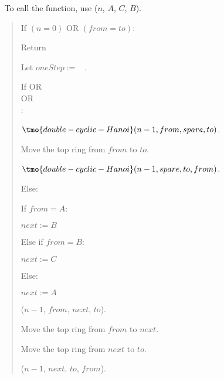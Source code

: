 \documentclass[10pt]{article}
\begin{document}
\begin{solution}\ %
  To call the function, use ($n$, $A$, $C$, $B$).
  \begin{quote}
  \noindent{}%

  \begin{steps}
    \item If $(n = 0)$ OR $(from = to)$:
      \begin{steps}
        \item Return
      \end{steps}
    \item Let \(oneStep := \) \boolF~.
    \item If \big[($from = A$) AND ($ to = B $)\big] OR \\
      \nf{\quad}\big[($ from = B $) AND ($ to = C $)\big] OR \\
      \nf{\quad}\big[($from = C$) AND ($ to = A $)\big]: 
        \begin{steps}
        \item $\tmo{double-cyclic-Hanoi}(n - 1, from, spare, to)$.
        \item Move the top ring from \( from \) to \( to \).
        \item $\tmo{double-cyclic-Hanoi}(n - 1, spare, to, from)$.
        \end{steps}
    \setcounter{stepsi}{3}
      \item Else: 
        \begin{steps}
        \item If \(from = A\):
          \begin{steps}
          \item \(next := B\)
          \end{steps}
        \item Else if \(from = B\):
          \begin{steps}
          \item \(next := C\)
          \end{steps}
        \item Else:
          \begin{steps}
          \item \(next := A\)
          \end{steps}
      \item {}($n - 1$, $from$, $next$, $ to $).
      \item Move the top ring from $ from $ to $ next $.
      \item Move the top ring from $ next $ to $ to $.
      \item {}($n - 1$, $next$, $to$, $from$).
      \end{steps}
    \end{steps}
  \end{quote}
\end{solution}
\end{document}

